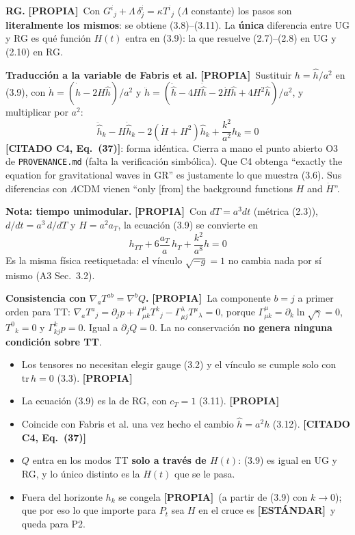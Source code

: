 \documentclass[11pt,a4paper]{article}
\newcommand{\propia}{{\bfseries\color{TealBlue}[PROPIA]}}
\newcommand{\estandar}{{\bfseries\color{BurntOrange}[ESTÁNDAR]}}
\newcommand{\citado}[1]{{\bfseries\color{RoyalBlue}[CITADO #1]}}
\newcommand{\sub}[2]{\par\medskip\noindent{\bfseries\color{NavyBlue}#1}\quad\textbf{#2}}
\begin{document}
\sub{3.6}{RG.} \propia\ Con $G^i{}_j+\Lambda\,\delta^i_j=\kappa T^i{}_j$ ($\Lambda$ constante) los pasos son \textbf{literalmente los mismos}: se obtiene (3.8)--(3.11). La \textbf{única} diferencia entre UG y RG es qué función $H(t)$ entra en (3.9): la que resuelve (2.7)--(2.8) en UG y (2.10) en RG.

\sub{3.7}{Traducción a la variable de Fabris et al.} \propia\ Sustituir $h=\hat h/a^2$ en (3.9), con $\dot h=(\dot{\hat h}-2H\hat h)/a^2$ y $\ddot h=(\ddot{\hat h}-4H\dot{\hat h}-2\dot H\hat h+4H^2\hat h)/a^2$, y multiplicar por $a^2$:
\begin{equation}
\ddot{\hat h}_k-H\dot{\hat h}_k-2(\dot H+H^2)\hat h_k+\frac{k^2}{a^2}\hat h_k=0\tag{3.12}
\end{equation}
\citado{C4, Eq.~(37)}: forma idéntica. Cierra a mano el punto abierto O3 de \texttt{PROVENANCE.md} (falta la verificación simbólica). Que C4 obtenga ``exactly the equation for gravitational waves in GR'' es justamente lo que muestra (3.6). Sus diferencias con $\Lambda$CDM vienen ``only [from] the background functions $H$ and $\dot H$''.

\sub{3.8}{Nota: tiempo unimodular.} \propia\ Con $dT=a^3dt$ (métrica (2.3)), $d/dt=a^3\,d/dT$ y $H=a^2a_T$, la ecuación (3.9) se convierte en
\begin{equation}
h_{TT}+6\frac{a_T}a\,h_T+\frac{k^2}{a^8}h=0\tag{3.13}
\end{equation}
Es la misma física reetiquetada: el vínculo $\sqrt{-g}=1$ no cambia nada por sí mismo (A3 Sec.~3.2).

\sub{3.9}{Consistencia con $\nabla_aT^{ab}=\nabla^bQ$.} \propia\ La componente $b=j$ a primer orden para TT: $\nabla_aT^a{}_j=\partial_jp+\Gamma^\mu_{\mu k}T^k{}_j-\Gamma^\lambda_{\mu j}T^\mu{}_\lambda=0$, porque $\Gamma^\mu_{\mu k}=\partial_k\ln\sqrt\gamma=0$, $T^0{}_k=0$ y $\Gamma^k_{kj}p=0$. Igual a $\partial_jQ=0$. La no conservación \textbf{no genera ninguna condición sobre TT}.

\begin{llevarse}
\begin{itemize}[nosep]
\item Los tensores no necesitan elegir gauge (3.2) y el vínculo se cumple solo con $\mathrm{tr}\,h=0$ (3.3). \propia
\item La ecuación (3.9) es la de RG, con $c_T=1$ (3.11). \propia
\item Coincide con Fabris et al. una vez hecho el cambio $\hat h=a^2h$ (3.12). \citado{C4, Eq.~(37)}
\item $Q$ entra en los modos TT \textbf{solo a través de $H(t)$}: (3.9) es igual en UG y RG, y lo único distinto es la $H(t)$ que se le pasa.
\item Fuera del horizonte $h_k$ se congela \propia\ (a partir de (3.9) con $k\to0$); que por eso lo que importe para $P_t$ sea $H$ en el cruce es \estandar\ y queda para P2.
\end{itemize}
\end{llevarse}
\end{document}
